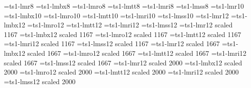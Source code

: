 \font\eightcrm=ts1-lmr8
\font\eightcbf=ts1-lmbx8
\font\eightcsl=ts1-lmro8
\font\eightctt=ts1-lmtt8
\font\eightcit=ts1-lmri8
\font\eightcss=ts1-lmss8
\font\tencrm=ts1-lmr10
\font\tencbf=ts1-lmbx10
\font\tencsl=ts1-lmro10
\font\tenctt=ts1-lmtt10
\font\tencit=ts1-lmri10
\font\tencss=ts1-lmss10
\font\twelvecrm=ts1-lmr12
\font\twelvecbf=ts1-lmbx12
\font\twelvecsl=ts1-lmro12
\font\twelvectt=ts1-lmtt12
\font\twelvecit=ts1-lmri12
\font\twelvecss=ts1-lmss12
\font\fourteencrm=ts1-lmr12 scaled 1167
\font\fourteencbf=ts1-lmbx12 scaled 1167
\font\fourteencsl=ts1-lmro12 scaled 1167
\font\fourteenctt=ts1-lmtt12 scaled 1167
\font\fourteencit=ts1-lmri12 scaled 1167
\font\fourteencss=ts1-lmss12 scaled 1167
\font\twentycrm=ts1-lmr12 scaled 1667
\font\twentycbf=ts1-lmbx12 scaled 1667
\font\twentycsl=ts1-lmro12 scaled 1667
\font\twentyctt=ts1-lmtt12 scaled 1667
\font\twentycit=ts1-lmri12 scaled 1667
\font\twentycss=ts1-lmss12 scaled 1667
\font\twentyfourcrm=ts1-lmr12 scaled 2000
\font\twentyfourcbf=ts1-lmbx12 scaled 2000
\font\twentyfourcsl=ts1-lmro12 scaled 2000
\font\twentyfourctt=ts1-lmtt12 scaled 2000
\font\twentyfourcit=ts1-lmri12 scaled 2000
\font\twentyfourcss=ts1-lmss12 scaled 2000
\def\t#1{{\edef\next{\the\font}\tcfont\accent"1B\next#1}}
\def\tcchar#1{{\edef\next{\the\font}\tcfont\char#1\next}}
\def\arrowl{{\tcchar{"18}}}
\def\arrowr{{\tcchar{"19}}}
\def\blank{{\tcchar{"20}}}
\def\dollar{{\tcchar{"24}}}
\def\caster{{\tcchar{"2A}}}
\def\sequals{{\tcchar{"2D}}}
\def\anglel{{\tcchar{"3C}}}
\def\angler{{\tcchar{"3E}}}
\def\mho{{\tcchar{"4D}}}
\def\bigcircle{{\tcchar{"4F}}}
\def\Ohm{{\tcchar{"57}}}
\def\bbracketl{{\tcchar{"5B}}}
\def\bbracketr{{\tcchar{"5D}}}
\def\arrowu{{\tcchar{"5E}}}
\def\arrowd{{\tcchar{"5F}}}
\def\textstar{{\tcchar{"62}}}
\def\born{{\tcchar{"63}}}
\def\died{{\tcchar{"64}}}
\def\leaf{{\tcchar{"6C}}}
\def\married{{\tcchar{"6D}}}
\def\music{{\tcchar{"6E}}}
\def\dag{{\tcchar{"84}}}%
\def\ddag{{\tcchar{"85}}}%
\def\doublevert{{\tcchar{"86}}}
\def\perthousand{{\tcchar{"87}}}
\def\bull{{\tcchar{"88}}}
\def\centigrade{{\tcchar{"89}}}
\def\olddollar{{\tcchar{"8A}}}
\def\oldcent{{\tcchar{"8B}}}
\def\florin{{\tcchar{"8C}}}
\def\Colon{{\tcchar{"8D}}}
